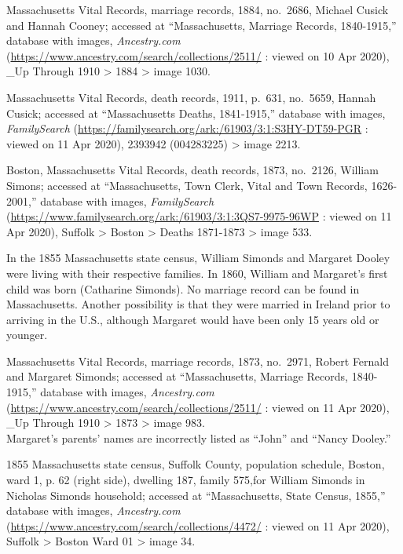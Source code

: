 \begin{thebibliography}{999}
	Massachusetts Vital Records, marriage records, 1884, no.\ 2686, Michael Cusick and Hannah Cooney; accessed at ``Massachusetts, Marriage Records, 1840-1915,'' database with images, \textit{Ancestry.com} (\url{https://www.ancestry.com/search/collections/2511/} : viewed on 10 Apr 2020), \_Up Through 1910 > 1884 > image 1030.
	
	Massachusetts Vital Records, death records, 1911, p.\ 631, no.\ 5659, Hannah Cusick; accessed at ``Massachusetts Deaths, 1841-1915,'' database with images, \textit{FamilySearch} (\url{https://familysearch.org/ark:/61903/3:1:S3HY-DT59-PGR} : viewed on 11 Apr 2020), 2393942 (004283225) > image 2213.
	
	Boston, Massachusetts Vital Records, death records, 1873, no.\ 2126, William Simons; accessed at ``Massachusetts, Town Clerk, Vital and Town Records, 1626-2001,'' database with images, \textit{FamilySearch} (\url{https://www.familysearch.org/ark:/61903/3:1:3QS7-9975-96WP} : viewed on 11 Apr 2020), Suffolk > Boston > Deaths 1871-1873 > image 533.
	
	In the 1855 Massachusetts state census, William Simonds and Margaret Dooley were living with their respective families. In 1860, William and Margaret's first child was born (Catharine Simonds). No marriage record can be found in Massachusetts. Another possibility is that they were married in Ireland prior to arriving in the U.S., although Margaret would have been only 15 years old or younger.
	
	Massachusetts Vital Records, marriage records, 1873, no.\ 2971, Robert Fernald and Margaret Simonds; accessed at ``Massachusetts, Marriage Records, 1840-1915,'' database with images, \textit{Ancestry.com} (\url{https://www.ancestry.com/search/collections/2511/} : viewed on 11 Apr 2020), \_Up Through 1910 > 1873 > image 983.\\
	Margaret's parents' names are incorrectly listed as ``John'' and ``Nancy Dooley.''
	
	1855 Massachusetts state census, Suffolk County, population schedule, Boston, ward 1, p. 62 (right side), dwelling 187, family 575,for William Simonds in Nicholas Simonds household; accessed at ``Massachusetts, State Census, 1855,'' database with images, \textit{Ancestry.com} (\url{https://www.ancestry.com/search/collections/4472/} : viewed on 11 Apr 2020), Suffolk > Boston Ward 01 > image 34.
	

\end{thebibliography}
